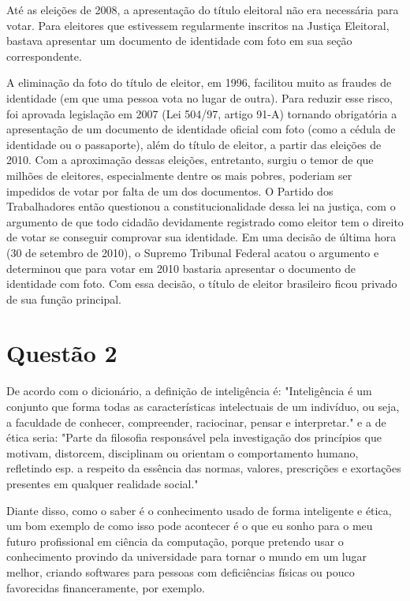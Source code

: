 \documentclass[a4paper,10pt]{article}
\begin{document}
Até as eleições de 2008, a apresentação do título eleitoral não era necessária para votar. Para eleitores que estivessem regularmente inscritos na Justiça Eleitoral, bastava apresentar um documento de identidade com foto em sua seção correspondente.

A eliminação da foto do título de eleitor, em 1996, facilitou muito as fraudes de identidade (em que uma pessoa vota no lugar de outra). Para reduzir esse risco, foi aprovada legislação em 2007 (Lei 504/97, artigo 91-A) tornando obrigatória a apresentação de um documento de identidade oficial com foto (como a cédula de identidade ou o passaporte), além do título de eleitor, a partir das eleições de 2010. Com a aproximação dessas eleições, entretanto, surgiu o temor de que milhões de eleitores, especialmente dentre os mais pobres, poderiam ser impedidos de votar por falta de um dos documentos. O Partido dos Trabalhadores então questionou a constitucionalidade dessa lei na justiça, com o argumento de que todo cidadão devidamente registrado como eleitor tem o direito de votar se conseguir comprovar sua identidade. Em uma decisão de última hora (30 de setembro de 2010), o Supremo Tribunal Federal acatou o argumento e determinou que para votar em 2010 bastaria apresentar o documento de identidade com foto. Com essa decisão, o título de eleitor brasileiro ficou privado de sua função principal.

\section{Questão 2}
De acordo com o dicionário, a definição de inteligência é: "Inteligência é um conjunto que forma todas as características intelectuais de um indivíduo, ou seja, a faculdade de conhecer, compreender, raciocinar, pensar e interpretar." e a de ética seria: "Parte da filosofia responsável pela investigação dos princípios que motivam, distorcem, disciplinam ou orientam o comportamento humano, refletindo esp. a respeito da essência das normas, valores, prescrições e exortações presentes em qualquer realidade social."

Diante disso, como o saber é o conhecimento usado de forma inteligente e ética, um bom exemplo de como isso pode acontecer é o que eu sonho para o meu futuro profissional em ciência da computação, porque pretendo usar o conhecimento provindo da universidade para tornar o mundo em um lugar melhor, criando softwares para pessoas com deficiências físicas ou pouco favorecidas financeramente, por exemplo.
\end{document}
